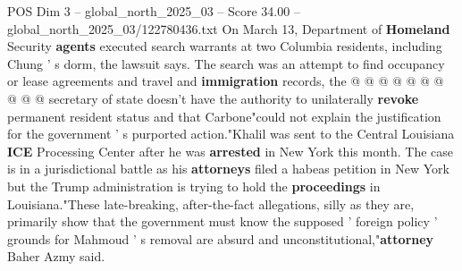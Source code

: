 \begin{textsample}{POS Dim 3 – global\_north\_2025\_03 – Score 34.00 – global\_north\_2025\_03/122780436.txt}
On March 13, Department of \textbf{Homeland} Security \textbf{agents} executed search warrants at two Columbia residents, including Chung ' s dorm, the lawsuit says.
The search was an attempt to find occupancy or lease agreements and travel and \textbf{immigration} records, the @ @ @ @ @ @ @ @ @ @ secretary of state doesn't have the authority to unilaterally \textbf{revoke} permanent resident status and that Carbone"could not explain the justification for the government ' s purported action."Khalil was sent to the Central Louisiana \textbf{ICE} Processing Center after he was \textbf{arrested} in New York this month.
The case is in a jurisdictional battle as his \textbf{attorneys} filed a habeas petition in New York but the Trump administration is trying to hold the \textbf{proceedings} in Louisiana."These late-breaking, after-the-fact allegations, silly as they are, primarily show that the government must know the supposed ' foreign policy ' grounds for Mahmoud ' s removal are absurd and unconstitutional,"\textbf{attorney} Baher Azmy said.

\end{textsample}

